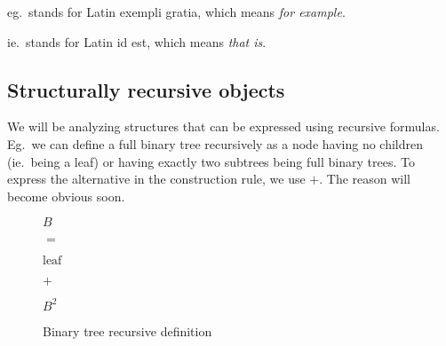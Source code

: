 \documentclass[final]{article}
\theoremstyle{definition}
\theoremstyle{remark}
\begin{document}
eg.\ stands for Latin exempli gratia, which means \textit{for example}.

ie.\ stands for Latin id est, which means \textit{that is}.

\subsection{Structurally recursive objects}%
\label{sub:structurally_recursive_objects}

We will be analyzing structures that can be expressed using recursive formulas. Eg.\ we can define a full binary tree recursively as a node having no children (ie.\ being a leaf) or having exactly two subtrees being full binary trees. To express the alternative in the construction rule, we use \(+\). The reason will become obvious soon.

\begin{figure}[h]
    \begin{center}
        \begin{minipage}[t]{.2\textwidth}
            \begin{center}
                \(B\)\\
            \end{center}
        \end{minipage}%
        \begin{minipage}[t]{.05\textwidth}
            \begin{center}
                \(=\)\\
            \end{center}
        \end{minipage}%
        \begin{minipage}[t]{.2\textwidth}
            \begin{center}
                \(\text{leaf}\)\\
            \end{center}
        \end{minipage}%
        \begin{minipage}[t]{.05\textwidth}
            \begin{center}
                \(+\)\\
            \end{center}
        \end{minipage}%
        \begin{minipage}[t]{.2\textwidth}
            \begin{center}
                \(B^2\)\\
            \end{center}
        \end{minipage}%
    \end{center}
    \caption{Binary tree recursive definition}
    \label{fig:binary_recursion}
\end{figure}
\end{document}

